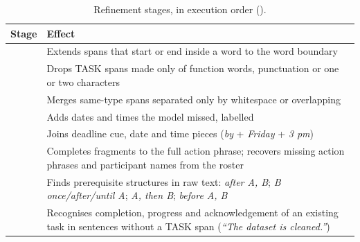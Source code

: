 \begin{table}[h]
\centering
\caption{Refinement stages, in execution order ().}
\label{tab:refine}
\footnotesize
\begin{tabularx}{\linewidth}{@{}p{34mm}L@{}}
\toprule
Stage & Effect \\
\midrule
{} & Extends spans that start or end inside a word to the word boundary \\
 & Drops TASK spans made only of function words, punctuation or one or two characters \\
 & Merges same-type spans separated only by whitespace or overlapping \\
 & Adds dates and times the model missed, labelled  \\
 & Joins deadline cue, date and time pieces (\emph{by} + \emph{Friday} + \emph{3 pm}) \\
 & Completes fragments to the full action phrase; recovers missing action phrases and participant names from the roster \\
 & Finds prerequisite structures in raw text: \emph{after A, B}; \emph{B once/after/until A}; \emph{A, then B}; \emph{before A, B} \\
 & Recognises completion, progress and acknowledgement of an existing task in sentences without a TASK span (\emph{``The dataset is cleaned.''}) \\
\bottomrule
\end{tabularx}
\end{table}

